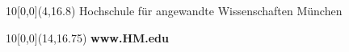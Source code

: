 \begin{titlepage}
\vspace{1.5cm}
\begin{center}
\large{\submissiontime}
\end{center}


\begin{textblock}{10}[0,0](4,16.8)
\tiny{ 
	Hochschule für angewandte Wissenschaften München
}
\end{textblock}

\begin{textblock}{10}[0,0](14,16.75)
\large{
	\textbf{www.HM.edu} 
}
\end{textblock}

\end{titlepage}
